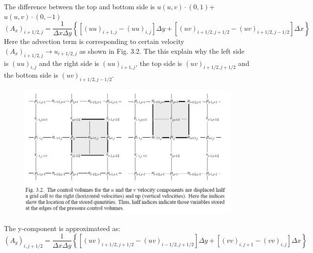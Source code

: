 \documentclass[11pt]{article} %
\begin{document}
The difference between the top and bottom side is $u (u,v)\cdot(0,1)$+$u (u,v)\cdot(0,-1)$\\
\begin{equation}
(A_{x})_{i+1/2, j} = \frac{1}{\Delta x\Delta y} \left\{\left[
(uu)_{i+1, j} -(uu)_{i, j}\right] \Delta y +\left[ (uv)_{i+1/2, j+1/2} -(uv)_{i+1/2, j-1/2}\right]\Delta x
\right\}
\end{equation}
Here the advection term is corresponding to certain velocity $(A_{x})_{i+1/2, j} \to u_{i+1/2, j}$ as shown in Fig. 3.2. The this explain why the left side is $(uu)_{i, j}$ and the right side is $(uu)_{i+1, j}$, the top side is $(uv)_{i+1/2, j+1/2}$  and the bottom side is $(uv)_{i+1/2, j-1/2}$. 
\begin{figure}[h]
\includegraphics[scale=0.6]{staggered mesh 3.2.JPG}
\centering
\end{figure}\par 
The y-component is approximateed as:
\begin{equation}
(A_{y})_{i, j+1/2} = \frac{1}{\Delta x\Delta y} \left\{\left[
(uv)_{i+1/2, j+1/2} -(uv)_{i-1/2, j+1/2}\right] \Delta y +\left[ (vv)_{i, j+1} -(vv)_{i, j}\right]\Delta x
\right\}
\end{equation}
\end{document}
